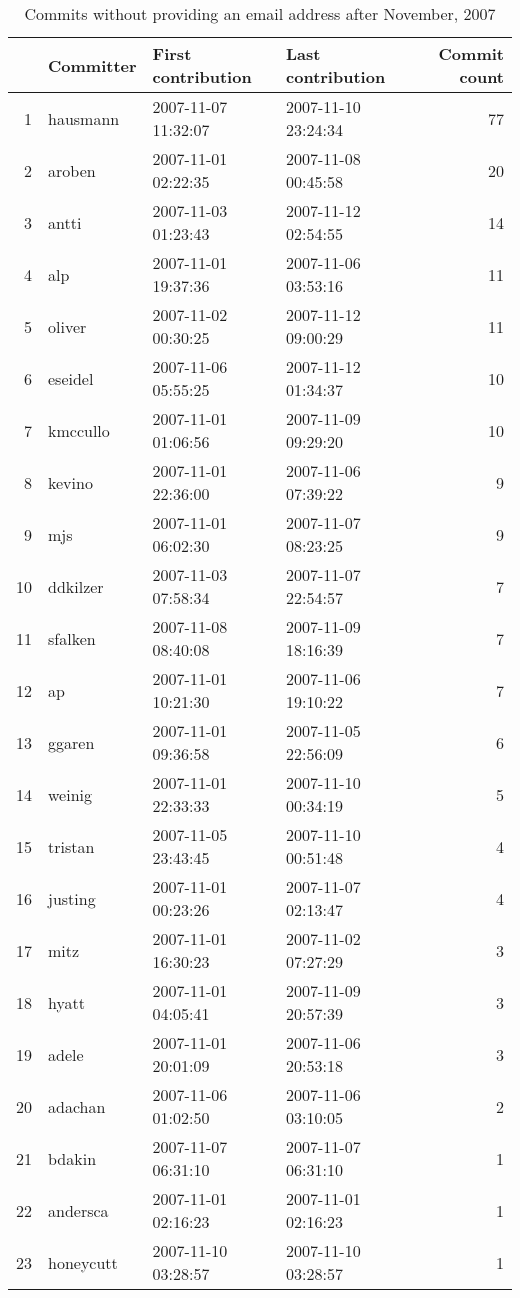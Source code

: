 \begin{table}[!htpb]
\begin{center}
\begin{tabular}{rlllr}
  \hline
 & Committer & First contribution & Last contribution & Commit count \\ 
  \hline
1 & hausmann & 2007-11-07 11:32:07 & 2007-11-10 23:24:34 &  77 \\ 
  2 & aroben & 2007-11-01 02:22:35 & 2007-11-08 00:45:58 &  20 \\ 
  3 & antti & 2007-11-03 01:23:43 & 2007-11-12 02:54:55 &  14 \\ 
  4 & alp & 2007-11-01 19:37:36 & 2007-11-06 03:53:16 &  11 \\ 
  5 & oliver & 2007-11-02 00:30:25 & 2007-11-12 09:00:29 &  11 \\ 
  6 & eseidel & 2007-11-06 05:55:25 & 2007-11-12 01:34:37 &  10 \\ 
  7 & kmccullo & 2007-11-01 01:06:56 & 2007-11-09 09:29:20 &  10 \\ 
  8 & kevino & 2007-11-01 22:36:00 & 2007-11-06 07:39:22 &   9 \\ 
  9 & mjs & 2007-11-01 06:02:30 & 2007-11-07 08:23:25 &   9 \\ 
  10 & ddkilzer & 2007-11-03 07:58:34 & 2007-11-07 22:54:57 &   7 \\ 
  11 & sfalken & 2007-11-08 08:40:08 & 2007-11-09 18:16:39 &   7 \\ 
  12 & ap & 2007-11-01 10:21:30 & 2007-11-06 19:10:22 &   7 \\ 
  13 & ggaren & 2007-11-01 09:36:58 & 2007-11-05 22:56:09 &   6 \\ 
  14 & weinig & 2007-11-01 22:33:33 & 2007-11-10 00:34:19 &   5 \\ 
  15 & tristan & 2007-11-05 23:43:45 & 2007-11-10 00:51:48 &   4 \\ 
  16 & justing & 2007-11-01 00:23:26 & 2007-11-07 02:13:47 &   4 \\ 
  17 & mitz & 2007-11-01 16:30:23 & 2007-11-02 07:27:29 &   3 \\ 
  18 & hyatt & 2007-11-01 04:05:41 & 2007-11-09 20:57:39 &   3 \\ 
  19 & adele & 2007-11-01 20:01:09 & 2007-11-06 20:53:18 &   3 \\ 
  20 & adachan & 2007-11-06 01:02:50 & 2007-11-06 03:10:05 &   2 \\ 
  21 & bdakin & 2007-11-07 06:31:10 & 2007-11-07 06:31:10 &   1 \\ 
  22 & andersca & 2007-11-01 02:16:23 & 2007-11-01 02:16:23 &   1 \\ 
  23 & honeycutt & 2007-11-10 03:28:57 & 2007-11-10 03:28:57 &   1 \\ 
   \hline
\end{tabular}
\caption{Commits without providing an email address after November, 2007}
\label{commits:november}
\end{center}
\end{table}
